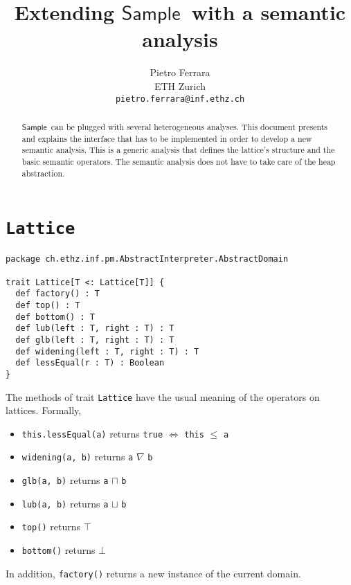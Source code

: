 \documentclass[11pt]{article}
\newcommand{\ScalaAnalyzer}{\ensuremath{\mathsf{Sample}}}
\newcommand{\statement}[1]{\lstinline{#1}}
\begin{document}
\title{Extending \ScalaAnalyzer\ with a semantic analysis}

\author{
Pietro Ferrara\\
ETH Zurich\\
\texttt{pietro.ferrara@inf.ethz.ch}
}

\maketitle

\begin{abstract}
\ScalaAnalyzer\ can be plugged with several heterogeneous analyses. This document presents and explains the interface that has to be implemented in order to develop a new semantic analysis. This is a generic analysis that defines the lattice's structure and the basic semantic operators. The semantic analysis does not have to take care of the heap abstraction.
\end{abstract}


\section{\statement{Lattice}}

\begin{lstlisting}
package ch.ethz.inf.pm.AbstractInterpreter.AbstractDomain

trait Lattice[T <: Lattice[T]] {
  def factory() : T
  def top() : T
  def bottom() : T
  def lub(left : T, right : T) : T
  def glb(left : T, right : T) : T
  def widening(left : T, right : T) : T
  def lessEqual(r : T) : Boolean
}
\end{lstlisting}

The methods of trait \statement{Lattice} have the usual meaning of the operators on lattices. Formally,
\begin{itemize}
\item \statement{this.lessEqual(a)} returns \statement{true} $\Leftrightarrow$ \statement{this} $\leq$ \statement{a}
\item \statement{widening(a, b)} returns \statement{a} $\nabla$ \statement{b}
\item \statement{glb(a, b)} returns \statement{a} $\sqcap$ \statement{b}
\item \statement{lub(a, b)} returns \statement{a} $\sqcup$ \statement{b}
\item \statement{top()} returns $\top$
\item \statement{bottom()} returns $\bot$
\end{itemize}
In addition, \statement{factory()} returns a new instance of the current domain.
\end{document}
